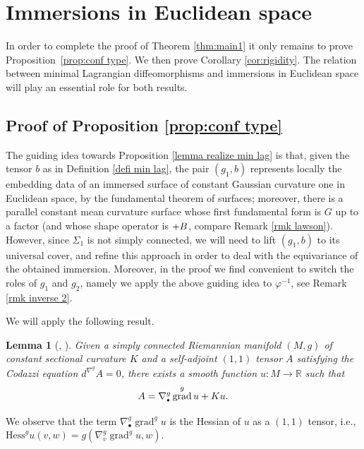 \documentclass[11pt]{article}
\makeatletter
\newcommand{\ie}{i.e.,\xspace}
\newcommand{\sbullet}{{\scriptscriptstyle\bullet}}
\DeclareRobustCommand{\mathbbm}[1]{\csname jepbb@#1\endcsname}
\newtheorem{lemma}[cor]{Lemma}
\theoremstyle{definition}
\newcommand{\R}{{\mathbb R}}
\DeclareMathOperator{\grad}{grad}
\makeatother
\begin{document}
\section{Immersions in Euclidean space}\label{sec:surfaces}

In order to complete the proof of Theorem \ref{thm:main1} it only remains to prove Proposition~\ref{prop:conf type}. We then prove Corollary \ref{cor:rigidity}. The relation between minimal Lagrangian diffeomorphisms and immersions in Euclidean space will play an essential role for both results.

\subsection{Proof of Proposition \ref{prop:conf type}}

The guiding idea towards Proposition \ref{lemma realize min lag} is that, given the tensor $b$ as in Definition \ref{defi min lag}, the pair $(g_1,b)$ represents locally the embedding data of an immersed surface of constant Gaussian curvature one in Euclidean space, by the fundamental theorem of surfaces; moreover, there is a parallel constant mean curvature surface whose first fundamental form is $G$ up to a factor (and whose shape operator is $\mathbbm 1+B$, compare Remark \ref{rmk lawson}). However, since $\Sigma_1$ is not simply connected, we will need to lift $(g_1,b)$ to its universal cover, and refine this approach in order to deal with the equivariance of the obtained immersion. Moreover, in the proof we find convenient to switch the roles of $g_1$ and $g_2$, namely we apply the above guiding idea to $\varphi^{-1}$, see Remark \ref{rmk inverse 2}.

We will apply the following result.

\begin{lemma}[{\cite{zbMATH03682587}, \cite[Prop.\,1.3.3]{zbMATH03791189}}] \label{lemma codazzi}
Given a simply connected Riemannian manifold $(M,g)$ of constant sectional curvature $K$ and a self-adjoint $(1,1)$ tensor $A$ satisfying the Codazzi equation $d^{\nabla^g}\!A=0$, there exists a smooth function $u:M\to\R$ such that
\[
A=\nabla^g_\sbullet\grad^gu+Ku\mathbbm 1.
\]
\end{lemma}

We observe that the term $\nabla^g_\sbullet\grad^gu$ is the Hessian of $u$ as a $(1,1)$ tensor, \ie $\mathrm{Hess}^g u(v,w)=g(\nabla^g_v\grad^gu,w)$.
\end{document}
